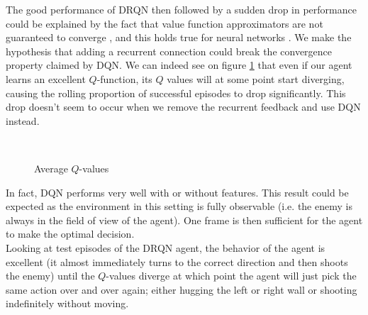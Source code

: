 \documentclass[letterpaper]{article}
\begin{document}
The good performance of DRQN then followed by a sudden drop in performance could
be explained by the fact that value function approximators are not guaranteed
to converge \citep{divergenceofRL}, and this holds true for
neural networks \citep{convergenceofRL}.
We make the hypothesis that adding a recurrent connection could break the
convergence property claimed by DQN.
We can indeed see on figure \ref{averageq} that
even if our agent learns an excellent $Q$-function, its $Q$ values will at some
point start diverging, causing the rolling proportion of successful episodes
to drop significantly. This drop doesn't seem to occur when we remove the
recurrent feedback and use DQN instead.\\

\begin{figure}
	\\
	\caption{Average $Q$-values}
	\label{averageq}
\end{figure}

In fact, DQN performs very well with or without features. This result could
be expected as the environment in this setting is fully observable (i.e.
the enemy is always in the field of view of the agent). One frame is then
sufficient for the agent to make the optimal decision.\\

Looking at test episodes of the DRQN agent, the behavior of the agent is excellent
(it almost
immediately turns to the correct direction and then shoots the enemy) until the
$Q$-values diverge at which point the agent will just pick the same action
over and over again; either hugging the left or right wall or shooting
indefinitely without moving.\\
\end{document}
